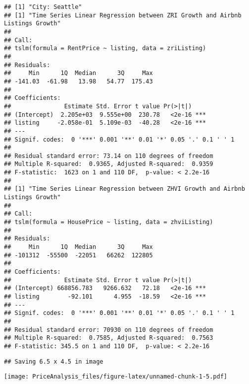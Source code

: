 \documentclass[
]{article}
\begin{document}
\begin{verbatim}
## [1] "City: Seattle"
## [1] "Time Series Linear Regression between ZRI Growth and Airbnb Listings Growth"
## 
## Call:
## tslm(formula = RentPrice ~ listing, data = zriListing)
## 
## Residuals:
##     Min      1Q  Median      3Q     Max 
## -141.03  -61.98   13.98   54.77  175.43 
## 
## Coefficients:
##               Estimate Std. Error t value Pr(>|t|)    
## (Intercept)  2.205e+03  9.555e+00  230.78   <2e-16 ***
## listing     -2.058e-01  5.109e-03  -40.28   <2e-16 ***
## ---
## Signif. codes:  0 '***' 0.001 '**' 0.01 '*' 0.05 '.' 0.1 ' ' 1
## 
## Residual standard error: 73.14 on 110 degrees of freedom
## Multiple R-squared:  0.9365, Adjusted R-squared:  0.9359 
## F-statistic:  1623 on 1 and 110 DF,  p-value: < 2.2e-16
## 
## [1] "Time Series Linear Regression between ZHVI Growth and Airbnb Listings Growth"
## 
## Call:
## tslm(formula = HousePrice ~ listing, data = zhviListing)
## 
## Residuals:
##     Min      1Q  Median      3Q     Max 
## -101312  -55500  -22051   66262  122805 
## 
## Coefficients:
##               Estimate Std. Error t value Pr(>|t|)    
## (Intercept) 668856.783   9266.632   72.18   <2e-16 ***
## listing        -92.101      4.955  -18.59   <2e-16 ***
## ---
## Signif. codes:  0 '***' 0.001 '**' 0.01 '*' 0.05 '.' 0.1 ' ' 1
## 
## Residual standard error: 70930 on 110 degrees of freedom
## Multiple R-squared:  0.7585, Adjusted R-squared:  0.7563 
## F-statistic: 345.5 on 1 and 110 DF,  p-value: < 2.2e-16
\end{verbatim}

\begin{verbatim}
## Saving 6.5 x 4.5 in image
\end{verbatim}

\texttt{[image: PriceAnalysis\_files/figure-latex/unnamed-chunk-1-5.pdf]}
\end{document}
